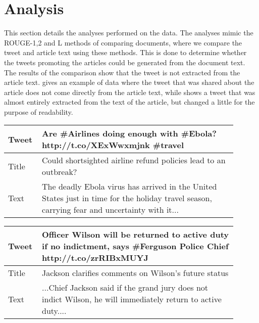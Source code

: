 \section{Analysis}
\label{sec:analysis}

This section details the analyses performed on the data. The analyses mimic the ROUGE-1,2 and L methods of comparing documents, where we compare the tweet and article text using these methods. This is done to determine whether the tweets promoting the articles could be generated from the document text. The results of the comparison show that the tweet is not extracted from the article text.  gives an example of data where the tweet that was shared about the article does not come directly from the article text, while  shows a tweet that was almost entirely extracted from the text of the article, but changed a little for the purpose of readability.

\begin{table}[htbp]
\centering
\begin{tabular}{|p{0.1\linewidth}|p{0.8\linewidth}|}
\hline
Tweet &  Are \#Airlines doing enough with \#Ebola? http://t.co/XExWwxmjnk \#travel \\ \hline
Title &  Could shortsighted airline refund policies lead to an outbreak? \\  \hline
Text  &  The deadly Ebola virus has arrived in the United States just in time for the holiday travel season, carrying fear and uncertainty with it... \\ \hline
\end{tabular}
\label{tab:noextract}
\end{table}

\begin{table}[htbp]
\centering
\begin{tabular}{|p{0.1\linewidth}|p{0.8\linewidth}|}
\hline
Tweet & Officer Wilson will be returned to active duty if no indictment, says \#Ferguson Police Chief http://t.co/zrRIBxMUYJ  \\ \hline
Title & Jackson clarifies comments on Wilson's future status \\ \hline
Text  & ...Chief Jackson said if the grand jury does not indict Wilson, he will immediately return to active duty.... \\ \hline
\end{tabular}
\label{tab:extract}
\end{table}

